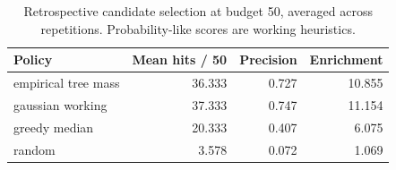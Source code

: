 \begin{table}[htbp]\centering\small
\caption{Retrospective candidate selection at budget 50, averaged across repetitions. Probability-like scores are working heuristics.}
\begin{tabular}{lrrr}
\toprule
Policy & Mean hits / 50 & Precision & Enrichment \\
\midrule
empirical tree mass & 36.333 & 0.727 & 10.855 \\
gaussian working & 37.333 & 0.747 & 11.154 \\
greedy median & 20.333 & 0.407 & 6.075 \\
random & 3.578 & 0.072 & 1.069 \\
\bottomrule
\end{tabular}\end{table}
